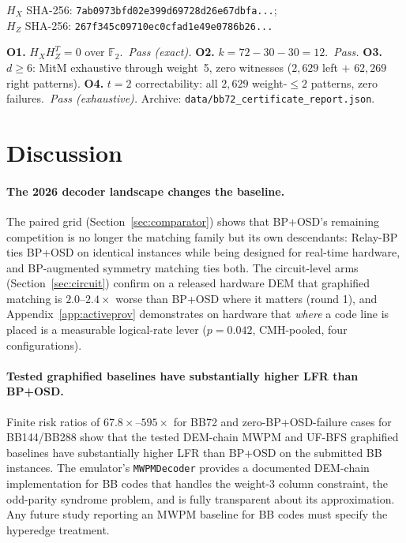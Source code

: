 \documentclass[11pt,a4paper]{article}
\begin{document}
$H_X$ SHA-256: \texttt{7ab0973bfd02e399d69728d26e67dbfa...};\\
$H_Z$ SHA-256: \texttt{267f345c09710ec0cfad1e49e0786b26...}

\textbf{O1.} $H_XH_Z^T=0$ over $\mathbb{F}_2$.\ \textit{Pass (exact).}
\textbf{O2.} $k=72-30-30=12$.\ \textit{Pass.}
\textbf{O3.} $d\ge6$: MitM exhaustive through weight~5, zero witnesses
($2{,}629$ left $+$ $62{,}269$ right patterns).
\textbf{O4.} $t=2$ correctability: all $2{,}629$ weight-$\le2$ patterns,
zero failures.\ \textit{Pass (exhaustive).}
Archive: \texttt{data/bb72\_certificate\_report.json}.

\section{Discussion}

\paragraph{The 2026 decoder landscape changes the baseline.}
The paired grid (Section~\ref{sec:comparator}) shows that BP+OSD's remaining
competition is no longer the matching family but its own descendants:
Relay-BP ties BP+OSD on identical instances while being designed for
real-time hardware, and BP-augmented symmetry matching ties both. The
circuit-level arms (Section~\ref{sec:circuit}) confirm on a released
hardware DEM that graphified matching is $2.0$--$2.4\times$ worse than
BP+OSD where it matters (round 1), and Appendix~\ref{app:activeprov}
demonstrates on hardware that \emph{where} a code line is placed is a
measurable logical-rate lever ($p=0.042$, CMH-pooled, four configurations).

\paragraph{Tested graphified baselines have substantially higher LFR than BP+OSD.}
Finite risk ratios of $67.8\times$--$595\times$ for BB72 and zero-BP+OSD-failure cases for BB144/BB288 show that the tested DEM-chain MWPM and UF-BFS graphified baselines have substantially higher LFR than BP+OSD on the submitted BB instances.
The emulator's \texttt{MWPMDecoder} provides a documented DEM-chain implementation for BB codes that handles the weight-3 column constraint, the odd-parity syndrome problem, and is fully transparent
about its approximation.
Any future study reporting an MWPM baseline for BB codes must specify
the hyperedge treatment.
\end{document}
